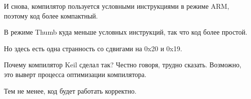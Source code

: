 ﻿

И снова, компилятор пользуется условными инструкциями в режиме ARM, поэтому код более 
компактный.



\myindex{\CompilerAnomaly}
\label{Keil_anomaly}

В режиме Thumb куда меньше условных инструкций, так что код более простой.

Но здесь есть одна странность со сдвигами на 0x20 и 0x19.

Почему компилятор Keil сделал так?
Честно говоря, трудно сказать.
Возможно, это выверт процесса оптимизации компилятора.

Тем не менее, код будет работать корректно.



